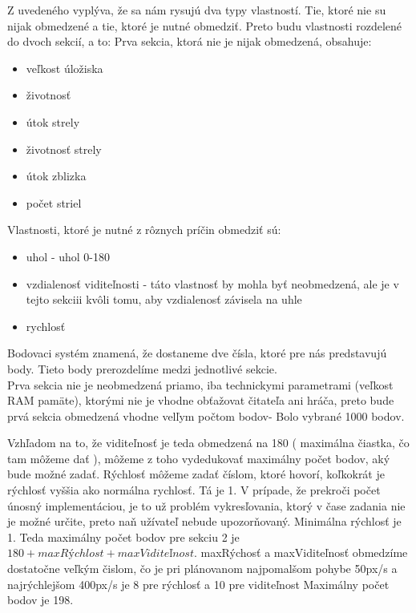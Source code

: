 Z uvedeného vyplýva, že sa nám rysujú dva typy vlastností. Tie, ktoré nie su nijak obmedzené a tie, ktoré je nutné obmedziť. Preto budu vlastnosti rozdelené do dvoch sekcií, a to:
Prva sekcia, ktorá nie je nijak obmedzená, obsahuje:
\begin{itemize}
\item veľkost úložiska
\item životnosť
\item útok strely
\item životnosť strely
\item útok zblizka
\item počet striel
\end{itemize}
Vlastnosti, ktoré je nutné z rôznych príčin obmedziť sú:
\begin{itemize}
\item uhol - uhol 0-180 
\item vzdialenosť viditeľnosti - táto vlastnosť by mohla byť neobmedzená, ale je v tejto sekciii kvôli tomu, aby vzdialenosť závisela na uhle
\item rychlosť%
\end{itemize}

Bodovaci systém znamená, že dostaneme dve čísla, ktoré pre nás predstavujú body. Tieto body prerozdelíme medzi jednotlivé sekcie.\\

Prva sekcia nie je neobmedzená priamo, iba technickymi parametrami (veľkost RAM pamäte), ktorými nie je vhodne obťažovat čitateľa ani hráča, preto bude prvá sekcia obmedzená vhodne velľym počtom bodov- Bolo vybrané 1000 bodov.

Vzhľadom na to, že viditeľnosť je teda obmedzená na 180 ( maximálna čiastka, čo tam môžeme dať ), môžeme z toho vydedukovať maximálny počet bodov, aký bude možné zadať. Rýchlosť môžeme zadať číslom, ktoré hovorí, koľkokrát je rýchlosť vyššia ako normálna rychlosť. Tá je 1.  V prípade, že prekroči počet únosný implementáciou, je to už problém vykresľovania, ktorý v čase zadania nie je možné určite, preto naň užívateľ nebude upozorňovaný. Minimálna rýchlosť je 1. Teda maximálny počet bodov pre sekciu 2 je $180 + maxRýchlost + maxViditeľnost$. maxRýchosť a maxViditeľnosť obmedzíme dostatočne veľkým čislom, čo je pri plánovanom najpomalšom pohybe 50px/s a najrýchlejšom 400px/s je 8 pre rýchlosť a 10 pre viditeľnost%
Maximálny počet bodov je 198. 

